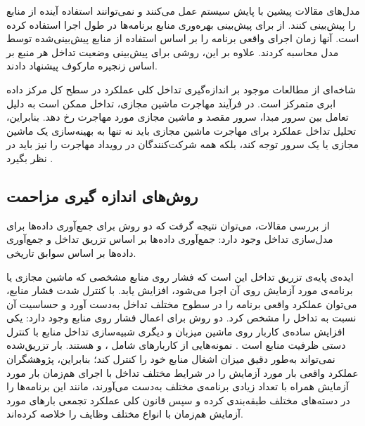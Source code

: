 مدل‌های مقالات پیشین با پایش سیستم عمل می‌کنند و نمی‌توانند استفاده آینده از منابع را پیش‌بینی کنند. \cite{Barve2019FECBench} از  برای پیش‌بینی بهره‌وری منابع برنامه‌ها در طول اجرا استفاده کرده است. آنها زمان اجرای واقعی برنامه را بر اساس استفاده از منابع پیش‌بینی‌شده توسط مدل محاسبه کردند. علاوه بر این، \cite{Chen2015CloudScope} روشی برای پیش‌بینی وضعیت تداخل هر منبع بر اساس زنجیره مارکوف پیشنهاد دادند.

شاخه‌ای از مطالعات موجود بر اندازه‌گیری تداخل کلی عملکرد در سطح کل مرکز داده ابری متمرکز است. در فرآیند مهاجرت ماشین مجازی، تداخل ممکن است به دلیل تعامل بین سرور مبدا، سرور مقصد و ماشین مجازی مورد مهاجرت رخ دهد. بنابراین، تحلیل تداخل عملکرد برای مهاجرت ماشین مجازی باید نه تنها به بهینه‌سازی یک ماشین مجازی یا یک سرور توجه کند، بلکه همه شرکت‌کنندگان در رویداد مهاجرت را نیز باید در نظر بگیرد \cite{Xu2014iAware, Shaw2019Energy}.

\subsection{روش‌های اندازه گیری مزاحمت}

از بررسی مقالات، می‌توان نتیجه گرفت که دو روش برای جمع‌آوری داده‌ها برای مدل‌سازی تداخل وجود دارد: جمع‌آوری داده‌ها بر اساس تزریق تداخل و جمع‌آوری داده‌ها بر اساس سوابق تاریخی.

ایده‌ی پایه‌ی تزریق تداخل این است که فشار روی منابع مشخصی که ماشین مجازی یا برنامه‌ی مورد آزمایش روی آن اجرا می‌شود، افزایش یابد. با کنترل شدت فشار منابع، می‌توان عملکرد واقعی برنامه را در سطوح مختلف تداخل به‌دست آورد و حساسیت آن نسبت به تداخل را مشخص کرد. دو روش برای اعمال فشار روی منابع وجود دارد: یکی افزایش ساده‌ی کاربار روی ماشین میزبان و دیگری شبیه‌سازی تداخل منابع با کنترل دستی ظرفیت منابع است \cite{Taheri2017vmBBProfiler}. نمونه‌هایی از کاربارهای  شامل \cite{Delimitrou2013iBench}، \cite{Mars2011CrossCore} و \cite{Govindan2011Cuanta} هستند. بار تزریق‌شده نمی‌تواند به‌طور دقیق میزان اشغال منابع خود را کنترل کند؛ بنابراین، پژوهشگران عملکرد واقعی بار مورد آزمایش را در شرایط مختلف تداخل با اجرای هم‌زمان بار مورد آزمایش همراه با تعداد زیادی برنامه‌ی مختلف به‌دست می‌آورند، مانند \cite{Barve2019FECBench} این برنامه‌ها را در دسته‌های مختلف طبقه‌بندی کرده و سپس قانون کلی عملکرد تجمعی بارهای مورد آزمایش هم‌زمان با انواع مختلف وظایف را خلاصه کرده‌اند.

